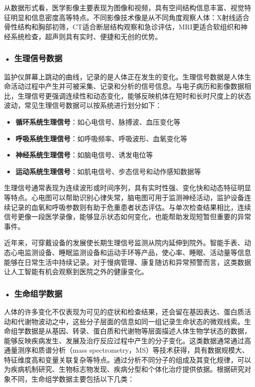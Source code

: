 从数据形式看，医学影像主要表现为图像和视频，具有空间结构信息丰富、视觉特征明显和信息密度高等特点。不同影像技术像是从不同角度观察人体：X射线适合骨性结构和胸部初筛，CT适合断层结构观察和急诊评估，MRI更适合软组织和神经系统检查，超声则具有实时、便捷和无创的优势。


\subsubsection*{\textbf{• 生理信号数据}}
监护仪屏幕上跳动的曲线，记录的是人体正在发生的变化。生理信号数据是人体生命活动过程中产生并可被采集、记录和分析的信号信息。与电子病历和影像数据相比，生理信号更强调连续性和动态变化，能够反映机体在短时和长时尺度上的状态波动，常见生理信号数据可以按系统进行划分如下：

\begin{itemize}
\item \textbf{循环系统生理信号}：如心电信号、脉搏波、血压变化等
\item \textbf{呼吸系统生理信号}：如呼吸频率、呼吸波形、血氧变化等
\item \textbf{神经系统生理信号}：如脑电信号、诱发电位等
\item \textbf{运动系统生理信号}：如肌电信号、步态信号和动作感知数据等
\end{itemize}

生理信号通常表现为连续波形或时间序列，具有实时性强、变化快和动态特征明显等特点。心电图可以帮助识别心律失常，脑电图可用于监测神经活动，监护设备连续记录的血氧和呼吸参数则有助于危重患者状态评估。与单次检查结果相比，连续信号更像一段医学录像，能够显示状态如何变化，也能帮助发现短暂但重要的异常事件。

近年来，可穿戴设备的发展使长期生理信号监测从院内延伸到院外。智能手表、动态心电监测设备、睡眠监测设备和运动手环等产品，使心率、睡眠、活动量等信息能够在日常生活中持续记录。对于慢病管理、康复随访和异常预警而言，这类数据让人工智能有机会观察到医院之外的健康变化。

\subsubsection*{\textbf{• 生命组学数据}}
人体的许多变化不仅表现为可见的症状和检查结果，还会留在基因表达、蛋白质活动和代谢物波动之中，这些分子层面的信息如同一组记录生命状态的微观线索。生命组学数据是从基因、转录、蛋白质和代谢物等层面描述人体生物学状态的数据，能够反映疾病发生、发展及治疗反应过程中产生的分子变化。这类数据通常通过高通量测序和质谱分析（mass spectrometry，MS）等技术获得，具有数据规模大、特征维度高和变量关联复杂等特点。通过分析不同分子的组成及其变化规律，可以为疾病机制研究、生物标志物发现、疾病分型和个体化治疗提供依据。根据研究对象不同，生命组学数据主要包括以下几类：

